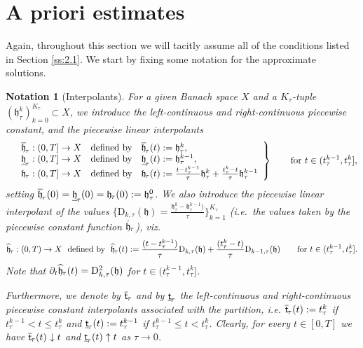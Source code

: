 \documentclass[a4paper,10pt,reqno]{amsart}
\numberwithin{equation}{section}
\numberwithin{equation}{section}
\newtheorem{notation}[theorem]{Notation}
\newcommand{\piecewiseConstant}[2]{\overline{#1}_{\kern-1pt#2}}
\newcommand{\pwc}{\piecewiseConstant}
\newcommand{\upiecewiseConstant}[2]{\underline{#1}_{\kern-1pt#2}}
\newcommand{\upwc}{\upiecewiseConstant}
\newcommand{\piecewiseLinear}[2]{{#1}_{\kern-1pt#2}}
\newcommand{\pwl}{\piecewiseLinear}
\newcommand{\pwwll}[2]{\widehat{#1}_{\kern-1pt#2}}
\newcommand{\Dtau}[2]{\mathrm{D}_{#1,\tau}(#2)}
\newcommand{\Ddtau}[2]{\mathrm{D}_{#1,\tau}^2(#2)}
\begin{document}
\section{\bf A priori estimates}
\label{s:aprio}
\noindent
Again, 
throughout this section we will tacitly assume all of the conditions listed in Section \ref{ss:2.1}.
We start by fixing some notation for the approximate solutions. 
\begin{notation}[Interpolants]
\upshape
For a given Banach space $X$ and a
$K_\tau$-tuple $( \mathfrak{h}_\tau^k )_{k=0}^{K_\tau}
\subset X$, we  introduce
 the left-continuous and  right-continuous piecewise constant, and the piecewise linear interpolants
\[
\left.
\begin{array}{llll}
& \pwc  {\mathfrak{h}}{\tau}: (0,T] \to X  & \text{defined by}  &
\pwc {\mathfrak{h}}{\tau}(t): = \mathfrak{h}_\tau^k,
\\
& \upwc  {\mathfrak{h}}{\tau}: (0,T] \to X  & \text{defined by}  &
\upwc {\mathfrak{h}}{\tau}(t) := \mathfrak{h}_\tau^{k-1},
\\
 &
\pwl  {\mathfrak{h}}{\tau}: (0,T] \to X  & \text{defined by} &
 \pwl {\mathfrak{h}}{\tau}(t):
=\frac{t-t_\tau^{k-1}}{\tau} \mathfrak{h}_\tau^k +
\frac{t_\tau^k-t}{\tau}\mathfrak{h}_\tau^{k-1}
\end{array}
\right\}
 \qquad \text{for $t \in
(t_\tau^{k-1}, t_\tau^k]$,}
\]
setting $\pwc  {\mathfrak{h}}{\tau}(0)= \upwc  {\mathfrak{h}}{\tau}(0)= \pwl  {\mathfrak{h}}{\tau}(0): = \mathfrak{h}_\tau^0$. 
We also introduce the piecewise linear interpolant    of the values
$\{ \Dtau  k {\mathfrak{h}}  = \tfrac{\mathfrak{h}_\tau^k - \mathfrak{h}_{\tau}^{k-1})}\tau\}_{k=1}^{K_\tau}$ (i.e.\  the
values taken by  the piecewise constant function $\pwl
{\dot{\mathfrak{h}}}{\tau}$), viz.
\[
\pwwll  {\mathfrak{h}}{\tau}: (0,T) \to X  \ \text{ defined by } \ \pwwll
{\mathfrak{h}}{\tau}(t) :=\frac{(t-t_\tau^{k-1})}{\tau}
\Dtau k  {\mathfrak{h}}  +
\frac{(t_\tau^k-t)}{\tau} \Dtau {k-1} {\mathfrak{h}}   \qquad \text{for $t \in
(t_\tau^{k-1}, t_\tau^k]$.}
\]
Note that $ {\partial_t \pwwll  {{\mathfrak{h}}}{\tau}}(t) =  \Ddtau k {\mathfrak{h}}  $ for $t \in
(t_\tau^{k-1}, t_\tau^k]$.

Furthermore, we   denote by  $\pwc{\mathsf{t}}{\tau}$ and by
$\upwc{\mathsf{t}}{\tau}$ the left-continuous and right-continuous
piecewise constant interpolants associated with the partition, i.e.
 $\pwc{\mathsf{t}}{\tau}(t) := t_\tau^k$ if $t_\tau^{k-1}<t \leq t_\tau^k $
and $\upwc{\mathsf{t}}{\tau}(t):= t_\tau^{k-1}$ if $t_\tau^{k-1}
\leq t < t_\tau^k $. Clearly, for every $t \in [0,T]$ we have
$\pwc{\mathsf{t}}{\tau}(t) \downarrow t$ and
$\upwc{\mathsf{t}}{\tau}(t) \uparrow t$ as $\tau\to 0$.
\end{notation}
\end{document}
